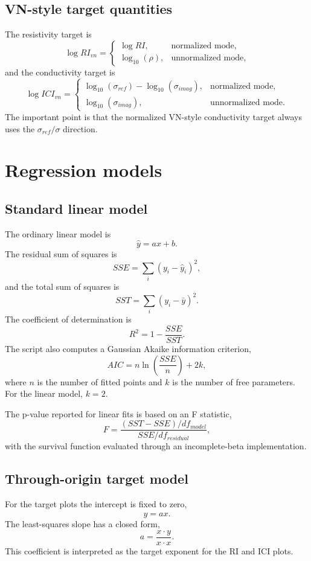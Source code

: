 \documentclass[11pt]{article}
\begin{document}
\subsection{VN-style target quantities}
The resistivity target is
\[
\log RI_{vn} =
\begin{cases}
\log RI, & \text{normalized mode},\\
\log_{10}(\rho), & \text{unnormalized mode},
\end{cases}
\]
and the conductivity target is
\[
\log ICI_{vn} =
\begin{cases}
\log_{10}(\sigma_{ref}) - \log_{10}(\sigma_{imag}), & \text{normalized mode},\\
\log_{10}(\sigma_{imag}), & \text{unnormalized mode}.
\end{cases}
\]
The important point is that the normalized VN-style conductivity target always uses the $\sigma_{ref}/\sigma$ direction.

\section{Regression models}
\subsection{Standard linear model}
The ordinary linear model is
\[
\hat y = ax + b.
\]
The residual sum of squares is
\[
SSE = \sum_i (y_i - \hat y_i)^2,
\]
and the total sum of squares is
\[
SST = \sum_i (y_i - \bar y)^2.
\]
The coefficient of determination is
\[
R^2 = 1 - \frac{SSE}{SST}.
\]
The script also computes a Gaussian Akaike information criterion,
\[
AIC = n\ln\!\left(\frac{SSE}{n}\right) + 2k,
\]
where $n$ is the number of fitted points and $k$ is the number of free parameters. For the linear model, $k=2$.

The p-value reported for linear fits is based on an F statistic,
\[
F = \frac{(SST-SSE)/df_{model}}{SSE/df_{residual}},
\]
with the survival function evaluated through an incomplete-beta implementation.

\subsection{Through-origin target model}
For the target plots the intercept is fixed to zero,
\[
\hat y = ax.
\]
The least-squares slope has a closed form,
\[
a = \frac{x\cdot y}{x\cdot x}.
\]
This coefficient is interpreted as the target exponent for the RI and ICI plots.
\end{document}
